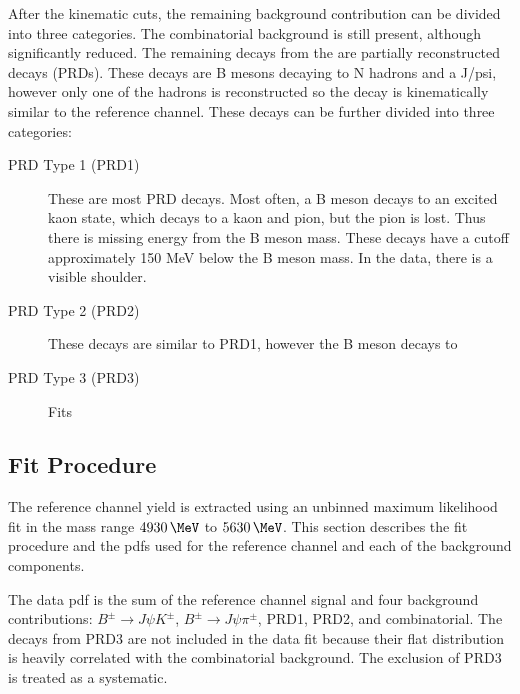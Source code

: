 After the kinematic cuts, the remaining background contribution can be divided into three categories. The combinatorial background is still present, although significantly reduced. The remaining decays from the \bbJpsiX are partially reconstructed decays (PRDs). These decays are B mesons decaying to N hadrons and a J/psi, however only one of the hadrons is reconstructed so the decay is kinematically similar to the reference channel. These decays can be further divided into three categories: 
\begin{description}
    \item[PRD Type 1 (PRD1)] These are most PRD decays. Most often, a B meson decays to an excited kaon state, which decays to a kaon and pion, but the pion is lost. Thus there is missing energy from the B meson mass. These decays have a cutoff approximately 150 MeV below the B meson mass. In the data, there is a visible shoulder. 

    \item[PRD Type 2 (PRD2)] These decays are similar to PRD1, however the B meson decays to 


    \item[PRD Type 3 (PRD3)] Fits

\end{description}

\subsection{Fit Procedure}
\label{subsec:refFit_procedure}

The reference channel yield is extracted using an unbinned maximum likelihood fit in the mass range $4930\,\MeV$ to $5630\,\MeV$. This section describes the fit procedure and the pdfs used for the reference channel and each of the background components.

The data pdf is the sum of the reference channel signal and four background contributions: $B^{\pm}\to J\psi K^\pm$, $B^{\pm}\to J\psi \pi^\pm$, PRD1, PRD2, and combinatorial. The decays from PRD3 are not included in the data fit because their flat distribution is heavily correlated with the combinatorial background. The exclusion of PRD3 is treated as a systematic. 

